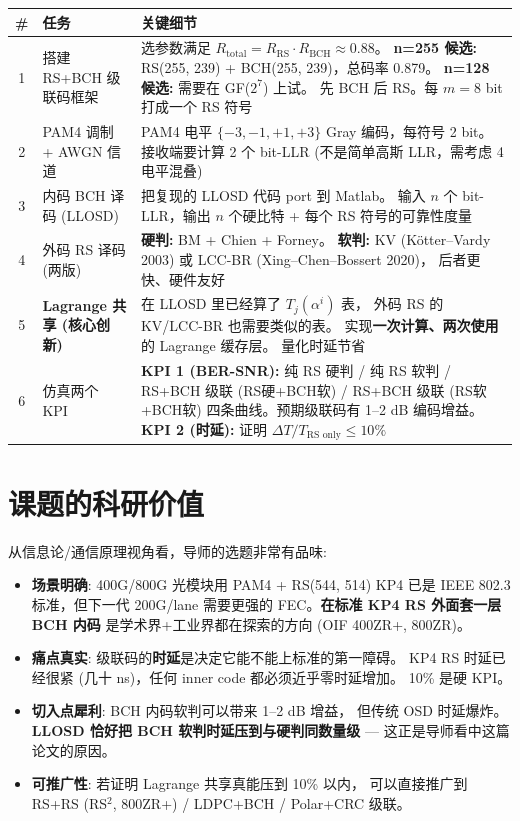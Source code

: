 \documentclass[11pt,a4paper]{article}
\begin{document}
\begin{table}[!ht]
\centering
\begin{tabularx}{\textwidth}{clX}
\toprule
\# & \textbf{任务} & \textbf{关键细节} \\
\midrule
1 & 搭建 RS+BCH 级联码框架 &
选参数满足 $R_{\text{total}} = R_{\text{RS}} \cdot R_{\text{BCH}} \approx 0.88$。
{\bf n=255 候选:} RS(255, 239) + BCH(255, 239)，总码率 0.879。
{\bf n=128 候选:} 需要在 GF($2^7$) 上试。
先 BCH 后 RS。每 $m=8$ bit 打成一个 RS 符号 \\
\midrule
2 & PAM4 调制 + AWGN 信道 &
PAM4 电平 $\{-3, -1, +1, +3\}$ Gray 编码，每符号 2 bit。
接收端要计算 2 个 bit-LLR (不是简单高斯 LLR，需考虑 4 电平混叠) \\
\midrule
3 & 内码 BCH 译码 (LLOSD) &
把复现的 LLOSD 代码 port 到 Matlab。
输入 $n$ 个 bit-LLR，输出 $n$ 个硬比特 + 每个 RS 符号的可靠性度量 \\
\midrule
4 & 外码 RS 译码 (两版) &
{\bf 硬判:} BM + Chien + Forney。
{\bf 软判:} KV (Kötter–Vardy 2003) 或 LCC-BR (Xing–Chen–Bossert 2020)，
后者更快、硬件友好 \\
\midrule
5 & \bf Lagrange 共享 (核心创新) &
在 LLOSD 里已经算了 $T_j(\alpha^i)$ 表，
外码 RS 的 KV/LCC-BR 也需要类似的表。
实现\textbf{一次计算、两次使用}的 Lagrange 缓存层。
量化时延节省 \\
\midrule
6 & 仿真两个 KPI &
{\bf KPI 1 (BER-SNR):} 纯 RS 硬判 / 纯 RS 软判 / RS+BCH 级联 (RS硬+BCH软) /
RS+BCH 级联 (RS软+BCH软) 四条曲线。预期级联码有 1--2 dB 编码增益。
{\bf KPI 2 (时延):} 证明 $\Delta T / T_{\text{RS only}} \leq 10\%$ \\
\bottomrule
\end{tabularx}
\end{table}

\section{课题的科研价值}

从信息论/通信原理视角看，导师的选题非常有品味:

\begin{itemize}[leftmargin=1.5em]
\item \textbf{场景明确}: 400G/800G 光模块用 PAM4 + RS(544, 514) KP4 已是 IEEE 802.3
  标准，但下一代 200G/lane 需要更强的 FEC。\textbf{在标准 KP4 RS 外面套一层 BCH 内码}
  是学术界+工业界都在探索的方向 (OIF 400ZR+, 800ZR)。
\item \textbf{痛点真实}: 级联码的\textbf{时延}是决定它能不能上标准的第一障碍。
  KP4 RS 时延已经很紧 (几十 ns)，任何 inner code 都必须近乎零时延增加。
  10\% 是硬 KPI。
\item \textbf{切入点犀利}: BCH 内码软判可以带来 1--2 dB 增益，
  但传统 OSD 时延爆炸。\textbf{LLOSD 恰好把 BCH 软判时延压到与硬判同数量级}
  --- 这正是导师看中这篇论文的原因。
\item \textbf{可推广性}: 若证明 Lagrange 共享真能压到 10\% 以内，
  可以直接推广到 RS+RS (RS$^2$, 800ZR+) / LDPC+BCH / Polar+CRC 级联。
\end{itemize}
\end{document}
